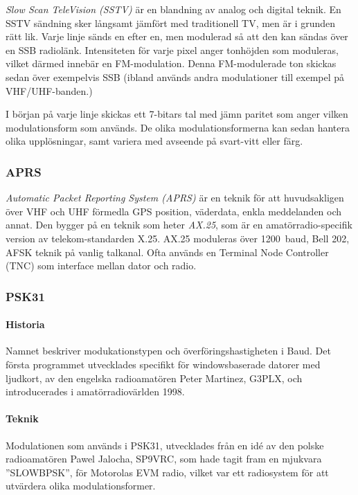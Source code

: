 \emph{Slow Scan TeleVision (SSTV)} är en blandning av analog och digital teknik.
En SSTV sändning sker långsamt jämfört med traditionell TV, men är i grunden
rätt lik. Varje linje sänds en efter en, men modulerad så att den kan sändas
över en SSB radiolänk. Intensiteten för varje pixel anger tonhöjden som moduleras,
vilket därmed innebär en FM-modulation. Denna FM-modulerade ton skickas sedan över
exempelvis SSB (ibland används andra modulationer till exempel på VHF/UHF-banden.)

I början på varje linje skickas ett 7-bitars tal med jämn paritet som anger
vilken modulationsform som används.
De olika modulationsformerna kan sedan hantera olika upplösningar, samt
variera med avseende på svart-vitt eller färg.

\subsubsection{APRS}

\emph{Automatic Packet Reporting System (APRS)} är en teknik för att
huvudsakligen över VHF och UHF förmedla GPS position, väderdata, enkla
meddelanden och annat.
Den bygger på en teknik som heter \emph{AX.25}, som är en amatörradio-specifik
version av telekom-standarden X.25.
AX.25 moduleras över 1200~baud, Bell 202, AFSK teknik på vanlig talkanal.
Ofta används en Terminal Node Controller (TNC) som interface mellan dator och
radio.

\subsubsection{PSK31}

\paragraph{Historia}

Namnet beskriver modukationstypen och överföringshastigheten i Baud.
Det första programmet utvecklades specifikt för windowsbaserade datorer med
ljudkort, av den engelska radioamatören Peter Martinez, G3PLX, och
introducerades i amatörradiovärlden 1998.

\paragraph{Teknik}

Modulationen som används i PSK31, utvecklades från en idé av den polske
radioamatören Pawel Jalocha, SP9VRC, som hade tagit fram en mjukvara
''SLOWBPSK'', för Motorolas EVM radio, vilket var ett radiosystem för att
utvärdera olika modulationsformer.

